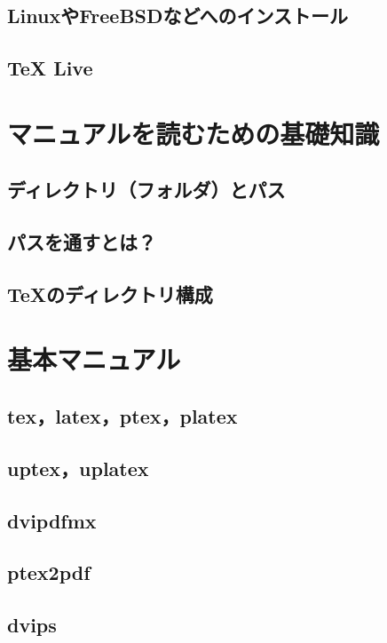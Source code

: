 \documentclass{jsbook}
\begin{document}
\section{LinuxやFreeBSDなどへのインストール}

\section{TeX Live}

\chapter{マニュアルを読むための基礎知識}

\section{ディレクトリ（フォルダ）とパス}

\section{パスを通すとは？}

\section{TeXのディレクトリ構成}

\chapter{基本マニュアル}

\section{tex，latex，ptex，platex}

\section{uptex，uplatex}

\section{dvipdfmx}

\section{ptex2pdf}

\section{dvips}
\end{document}
